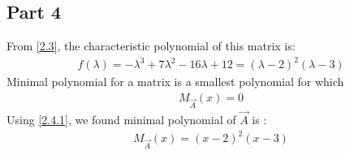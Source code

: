 \documentclass[journal,12pt,twocolumn]{IEEEtran}
\numberwithin{table}{section}
\begin{document}
 \subsection{Part 4}
 From \eqref{2.3}, the characteristic polynomial of this matrix is: 
 \begin{align}
f(\lambda) = -{\lambda}^3+7{\lambda}^2 -16\lambda +12 = (\lambda - 2)^2 (\lambda - 3)
 \end{align}
 Minimal polynomial for a matrix is a smallest polynomial for which
 \begin{align}
 M_{\vec{A}}(x) = 0 \label{2.4.1}
 \end{align}
 Using \eqref{2.4.1}, we found minimal polynomial of $\vec{A}$ is :
 \begin{align}
 M_{\vec{A}}(x) = (x-2)^2(x-3)
 \end{align}	
\end{document}
